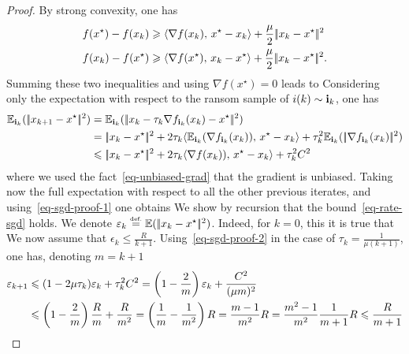 \begin{proof}
	By strong convexity, one has
	\begin{align*}
		f(x^\star) - f(x_k) &\geqslant \langle  \nabla f(x_k) ,\, x^\star-x_k \rangle + \frac{\mu}{2}|\!| x_k-x^\star |\!|^2 \\
		f(x_k) - f(x^\star) &\geqslant \langle  \nabla f(x^\star) ,\, x_k - x^\star \rangle + \frac{\mu}{2}|\!| x_k-x^\star |\!|^2.
	\end{align*}
	Summing these two inequalities and using $\nabla f(x^\star)=0$ leads to
	Considering only the expectation with respect to the ransom sample of $i(k) \sim \mathrm{\bf i}_k$, one has
	\begin{align*}
		\EE_{\ip_k}( \norm{x_{k+1}-x^\star}^2 )
		&= 
		\EE_{\ip_k}( \norm{x_k - \tau_k \nabla f_{\ip_k}(x_k) -x^\star}^2 ) \\
		&= 
		\norm{x_k - x^\star}^2 + 2\tau_k \dotp{ \EE_{\ip_k}(\nabla f_{\ip_k}(x_k)) }{ x^\star - x_k  } + 
			\tau_k^2  \EE_{\ip_k}( \norm{\nabla f_{\ip_k}(x_k)}^2 ) \\
		&\leq
		\norm{x_k - x^\star}^2 + 2\tau_k \dotp{ \nabla f(x_k)) }{ x^\star - x_k  } + \tau_k^2 C^2 \\
	\end{align*}
	where we used the fact~\eqref{eq-unbiased-grad} that the gradient is unbiased. 
	Taking now the full expectation with respect to all the other previous iterates, and using~\eqref{eq-sgd-proof-1} one obtains
	We show by recursion that the bound~\eqref{eq-rate-sgd} holds. We denote $\varepsilon_k \stackrel{\mbox{\upshape\tiny def.}}{=} \mathbb{E}( |\!| x_k-x^\star |\!|^2 )$.
	Indeed, for $k=0$, this it is true that 
	We now assume that $\epsilon_k \leq \frac{R}{k+1}$. Using~\eqref{eq-sgd-proof-2} in the case of $\tau_k = \frac{1}{\mu (k+1)}$, one has, denoting $m=k+1$
	\begin{align*}
		\varepsilon_{k+1} &\leqslant (1-2 \mu \tau_k) \varepsilon_k + \tau_k^2 C^2 = 
			\left( 1-\frac{2}{m} \right) \varepsilon_k + \frac{C^2}{(\mu m)^2}  \\  
			&\leqslant
			\left( 1-\frac{2}{m} \right) \frac{R}{m} + \frac{R}{m^2}  = 
			\left(  \frac{1}{m}-\frac{1}{m^2}  \right) R
			= 
			\frac{m-1}{m^2} R
			= 
			\frac{m^2-1}{m^2}\frac{1}{m+1} R
			\leqslant
			\frac{R}{m+1}
	\end{align*}
\end{proof}

